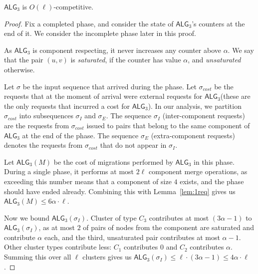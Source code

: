 \documentclass[manuscript,screen=true]{acmart}
\newcommand{\TAlg}{{\ensuremath{\textsf{ALG}_{3}}}\xspace} %
\begin{document}
\begin{theorem}
  \TAlg is $O(\ell)$-competitive.
\end{theorem}
\begin{proof}
  Fix a completed phase, and consider the state of \TAlg's counters at the end of it.
  We consider the incomplete phase later in this proof.

  As \TAlg is component respecting, it never increases any counter above $\alpha$.
  We say that the pair $(u, v)$ is \emph{saturated}, if the counter has value $\alpha$, and \emph{unsaturated} otherwise.


  Let $\sigma$ be the input sequence that arrived during the phase.
  Let $\sigma_{cost}$ be the requests that at the moment of arrival were external requests for \TAlg (these are the only requests that incurred a cost for \TAlg).
  In our analysis, we partition $\sigma_{cost}$ into subsequences $\sigma_I$ and $\sigma_E$.
  The sequence $\sigma_I$ (inter-component requests) are the requests from $\sigma_{cost}$ issued to pairs that belong to the same component of \TAlg at the end of the phase.
  The sequence $\sigma_E$ (extra-component requests) denotes the requests from $\sigma_{cost}$ that do not appear in $\sigma_I$.


  Let $\TAlg(M)$ be the cost of migrations performed by \TAlg in this phase.
  During a single phase, it performs at most $2 \ell$ component merge operations, as
  exceeding this number means that a component of size $4$ exists, and the phase should have ended already.
  Combining this with Lemma~\ref{lem:1req} gives us $\TAlg(M) \leq 6\alpha\cdot\ell$.
  
  Now we bound $\TAlg(\sigma_I)$.
  Cluster of type $C_3$ contributes at most $(3 \alpha - 1)$ to $\TAlg(\sigma_I)$, as at most $2$ of pairs of nodes from the component are saturated and contribute $\alpha$ each, and the third, unsaturated pair contributes at most $\alpha-1$.
  Other cluster types contribute less: $C_1$ contributes $0$ and $C_2$ contributes $\alpha$.
  Summing this over all $\ell$ clusters gives us $\TAlg(\sigma_I) \leq \ell \cdot (3 \alpha-1) \leq 4\alpha\cdot\ell$.


\end{proof}
\end{document}
